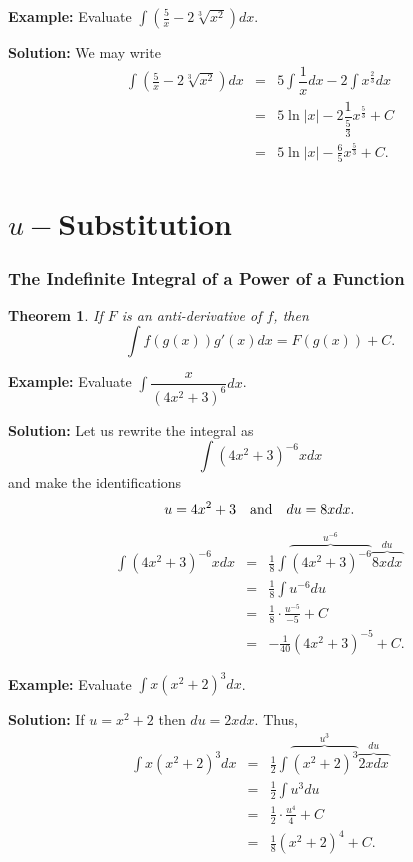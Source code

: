 \documentclass[titlepage,a4paper,12pt]{report}
\newtheorem{theorem}{Theorem}[section]
\begin{document}
\noindent \textbf{Example:} Evaluate $\displaystyle \int \left(\frac{5}{x}-2\sqrt[3]{x^2}\right)dx$.

\noindent \textbf{Solution:} We may write 
\begin{eqnarray*}
\int \left(\frac{5}{x}-2\sqrt[3]{x^2}\right)dx &=& 5\int \dfrac{1}{x} dx -2\int x^{\frac{2}{3}}dx\\
&=& 5\ln |x| -2\dfrac{1}{\frac{5}{3}}x^{\frac{5}{3}} +C\\
&=& 5\ln |x| -\frac{6}{5}x^{\frac{5}{3}} +C.
\end{eqnarray*}
\section{$u-$Substitution}
\subsubsection{The Indefinite Integral of a Power of a Function}
\begin{theorem}
If $F$ is an anti-derivative of $f$, then 
\begin{equation*}
\int f(g(x))g'(x)dx=F(g(x))+C.
\end{equation*}
\end{theorem}

\noindent \textbf{Example:} Evaluate $\displaystyle \int \dfrac{x}{(4x^2+3)^6} dx$.

\noindent \textbf{Solution:} Let us rewrite the integral as 
\begin{equation*}
\int (4x^2+3)^{-6} xdx
\end{equation*}
and make the identifications 
\begin{equation*}
u=4x^2+3 \quad \hbox{and} \quad du=8xdx.
\end{equation*}
\begin{eqnarray*}
\int (4x^2+3)^{-6} xdx  &=&\frac{1}{8} \int \overbrace{(4x^2+3)^{-6}}^{u^{-6}} \overbrace{8x dx}^{du}\\
&=&\frac{1}{8}\int u^{-6} du \\
&=& \frac{1}{8} \cdot \frac{u^{-5}}{-5}+C\\
&=& -\frac{1}{40}(4x^2+3)^{-5} +C.
\end{eqnarray*}

\noindent \textbf{Example:} Evaluate $\displaystyle \int x(x^2+2)^3 dx$.

\noindent \textbf{Solution:} If $u=x^2+2$ then $du=2xdx$. Thus, 
\begin{eqnarray*}
\int x(x^2+2)^3 dx &=& \frac{1}{2} \int \overbrace{(x^2+2)^3}^{u^3} \overbrace{2xdx}^{du}\\
&=& \frac{1}{2}\int u^3 du\\
&=& \frac{1}{2}\cdot \frac{u^4}{4} +C\\
&=& \frac{1}{8} (x^2+2)^4 +C.
\end{eqnarray*}
\end{document}
